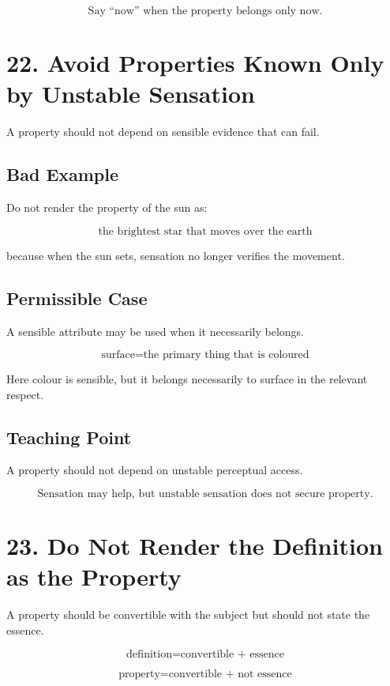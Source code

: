 \documentclass[12pt]{article}
\begin{document}
\[
\boxed{
\text{Say ``now'' when the property belongs only now.}
}
\]

\section*{22. Avoid Properties Known Only by Unstable Sensation}

A property should not depend on sensible evidence that can fail.

\subsection*{Bad Example}

Do not render the property of the sun as:

\[
\text{the brightest star that moves over the earth}
\]

because when the sun sets, sensation no longer verifies the movement.

\subsection*{Permissible Case}

A sensible attribute may be used when it necessarily belongs.

\[
\text{surface} = \text{the primary thing that is coloured}
\]

Here colour is sensible, but it belongs necessarily to surface in the relevant
respect.

\subsection*{Teaching Point}

A property should not depend on unstable perceptual access.

\[
\boxed{
\text{Sensation may help, but unstable sensation does not secure property.}
}
\]

\section*{23. Do Not Render the Definition as the Property}

A property should be convertible with the subject but should not state the
essence.

\[
\text{definition} = \text{convertible + essence}
\]

\[
\text{property} = \text{convertible + not essence}
\]
\end{document}
